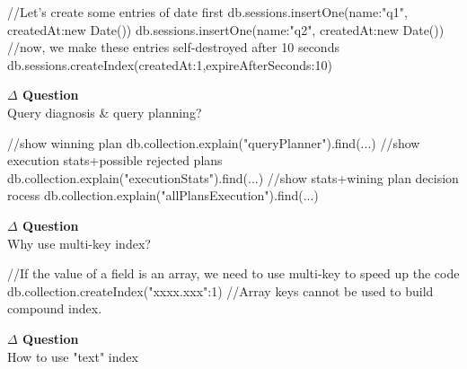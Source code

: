 \documentclass[12pt]{article}
\newenvironment{que}
    { \begin{mdframed}[backgroundcolor=green!20] \textbf{$\Delta$ Question} \\}
    {  \end{mdframed}}
\begin{document}
\begin{code}
//Let's create some entries of date first
db.sessions.insertOne({name:"q1", createdAt:new Date()})
db.sessions.insertOne({name:"q2", createdAt:new Date()})
//now, we make these entries self-destroyed after 10 seconds
db.sessions.createIndex({createdAt:1},{expireAfterSeconds:10})

\begin{que}
Query diagnosis \& query planning?
\end{que}
\begin{code}
//show winning plan
db.collection.explain("queryPlanner").find(...)
//show execution stats+possible rejected plans
db.collection.explain("executionStats").find(...)
//show stats+wining plan decision rocess
db.collection.explain("allPlansExecution").find(...)
\end{code}
\begin{que}
Why use multi-key index?
\end{que}
\begin{code}
//If the value of a field is an array, we need to use multi-key to speed up the code
db.collection.createIndex({"xxxx.xxx":1})
//Array keys cannot be used to build compound index.
\end{code}
\begin{que}
How to use "text" index
\end{que}
\end{code}
\end{document}
